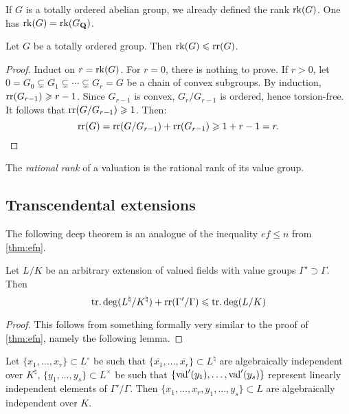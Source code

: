 If $G$ is a totally ordered abelian group, we already defined the rank 
$\operatorname{rk}(G)$. One has $\operatorname{rk}(G) = \operatorname{rk}(G_{\mathbf{Q}})$. 

\begin{lemma}
Let $G$ be a totally ordered group. Then $\operatorname{rk}(G)\leqslant \operatorname{rr}(G)$. 
\end{lemma}
\begin{proof}
Induct on $r=\operatorname{rk}(G)$. For $r=0$, there is nothing to prove. If $r>0$, let 
$0=G_0\subsetneq G_1\subsetneq \cdots \subsetneq G_r=G$ be a chain of convex 
subgroups. By induction, $\operatorname{rr}(G_{r-1})\geqslant r-1$. Since 
$G_{r-1}$ is convex, $G_r/G_{r-1}$ is ordered, hence torsion-free. It follows 
that $\operatorname{rr}(G/G_{r-1})\geqslant 1$. Then:
\[
  \operatorname{rr}(G) = \operatorname{rr}(G/G_{r-1}) + \operatorname{rr}(G_{r-1}) \geqslant 1+r-1 = r .
\]
\end{proof}

\begin{definition}
The \emph{rational rank} of a valuation is the rational rank of its value 
group. 
\end{definition}





\subsection{Transcendental extensions}

The following deep theorem is an analogue of the inequality $e f\leqslant n$ 
from \autoref{thm:efn}. 

\begin{theorem}
Let $L/K$ be an arbitrary extension of valued fields with value groups 
$\Gamma'\supset\Gamma$. Then 
\[
  \operatorname{tr.deg}(L^\natural/K^\natural) + \operatorname{rr}(\Gamma'/\Gamma) \leqslant \operatorname{tr.deg}(L/K)
\]
\end{theorem}
\begin{proof}
This follows from something formally very similar to the proof of 
\autoref{thm:efn}, namely the following lemma.
\end{proof}

\begin{lemma}
Let $\{x_1,\dots,x_r\}\subset L^\circ$ be such that 
$\{\overline{x_1},\dots,\overline{x_r}\}\subset L^\natural$ are algebraically 
independent over $K^\natural$, $\{y_1,\dots,y_s\}\subset L^\times$ be such 
that $\{\operatorname{val}'(y_1),\dots,\operatorname{val}'(y_s)\}$ represent linearly 
independent elements of $\Gamma'/\Gamma$. Then 
$\{x_1,\dots,x_r,y_1,\dots,y_s\}\subset L$ are algebraically independent over 
$K$. 
\end{lemma}




